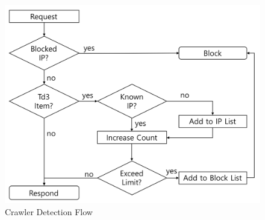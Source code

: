 \documentclass[sigconf,anonymous=false]{acmart}
\begin{document}
\begin{figure}[H]
    \includegraphics[width=0.8\columnwidth]{figs/flow_chart_01.png}
    \caption{Crawler Detection Flow}
    \label{fig:my_label}
\end{figure}
\end{document}
